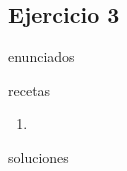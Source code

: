 \subsection{Ejercicio 3}
\def\parte{enunciados}
\ifx\capitulo\parte

\fi

\def\parte{recetas}
\ifx\capitulo\parte
\begin{enumerate}
\item
\end{enumerate}
\fi

\def\parte{soluciones}
\ifx\capitulo\parte
%
\fi
